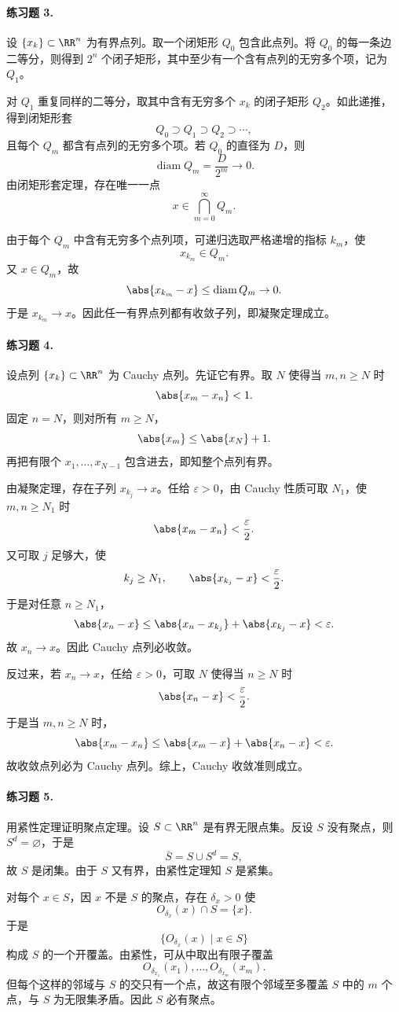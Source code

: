 \paragraph{练习题 3.}
\begin{xsolution}
设 $\{x_k\}\subset\RR^n$ 为有界点列。取一个闭矩形 $Q_0$ 包含此点列。将 $Q_0$ 的每一条边二等分，则得到 $2^n$ 个闭子矩形，其中至少有一个含有点列的无穷多个项，记为 $Q_1$。

对 $Q_1$ 重复同样的二等分，取其中含有无穷多个 $x_k$ 的闭子矩形 $Q_2$。如此递推，得到闭矩形套
\[
  Q_0\supset Q_1\supset Q_2\supset\cdots,
\]
且每个 $Q_m$ 都含有点列的无穷多个项。若 $Q_0$ 的直径为 $D$，则
\[
  \operatorname{diam}Q_m=\frac{D}{2^m}\to0.
\]
由闭矩形套定理，存在唯一一点
\[
  x\in\bigcap_{m=0}^\infty Q_m.
\]

由于每个 $Q_m$ 中含有无穷多个点列项，可递归选取严格递增的指标 $k_m$，使
\[
  x_{k_m}\in Q_m.
\]
又 $x\in Q_m$，故
\[
  \abs{x_{k_m}-x}\leq\operatorname{diam}Q_m\to0.
\]
于是 $x_{k_m}\to x$。因此任一有界点列都有收敛子列，即凝聚定理成立。
\end{xsolution}

\paragraph{练习题 4.}
\begin{xsolution}
设点列 $\{x_k\}\subset\RR^n$ 为 Cauchy 点列。先证它有界。取 $N$ 使得当 $m,n\geq N$ 时
\[
  \abs{x_m-x_n}<1.
\]
固定 $n=N$，则对所有 $m\geq N$，
\[
  \abs{x_m}\leq\abs{x_N}+1.
\]
再把有限个 $x_1,\ldots,x_{N-1}$ 包含进去，即知整个点列有界。

由凝聚定理，存在子列 $x_{k_j}\to x$。任给 $\varepsilon>0$，由 Cauchy 性质可取 $N_1$，使 $m,n\geq N_1$ 时
\[
  \abs{x_m-x_n}<\frac\varepsilon2.
\]
又可取 $j$ 足够大，使
\[
  k_j\geq N_1,
  \qquad
  \abs{x_{k_j}-x}<\frac\varepsilon2.
\]
于是对任意 $n\geq N_1$，
\[
  \abs{x_n-x}
  \leq\abs{x_n-x_{k_j}}+\abs{x_{k_j}-x}
  <\varepsilon.
\]
故 $x_n\to x$。因此 Cauchy 点列必收敛。

反过来，若 $x_n\to x$，任给 $\varepsilon>0$，可取 $N$ 使得当 $n\geq N$ 时
\[
  \abs{x_n-x}<\frac\varepsilon2.
\]
于是当 $m,n\geq N$ 时，
\[
  \abs{x_m-x_n}
  \leq\abs{x_m-x}+\abs{x_n-x}
  <\varepsilon.
\]
故收敛点列必为 Cauchy 点列。综上，Cauchy 收敛准则成立。
\end{xsolution}

\paragraph{练习题 5.}
\begin{xsolution}
用紧性定理证明聚点定理。设 $S\subset\RR^n$ 是有界无限点集。反设 $S$ 没有聚点，则 $S^d=\varnothing$，于是
\[
  \overline S=S\cup S^d=S,
\]
故 $S$ 是闭集。由于 $S$ 又有界，由紧性定理知 $S$ 是紧集。

对每个 $x\in S$，因 $x$ 不是 $S$ 的聚点，存在 $\delta_x>0$ 使
\[
  O_{\delta_x}(x)\cap S=\{x\}.
\]
于是
\[
  \{O_{\delta_x}(x)\mid x\in S\}
\]
构成 $S$ 的一个开覆盖。由紧性，可从中取出有限子覆盖
\[
  O_{\delta_{x_1}}(x_1),\ldots,O_{\delta_{x_m}}(x_m).
\]
但每个这样的邻域与 $S$ 的交只有一个点，故这有限个邻域至多覆盖 $S$ 中的 $m$ 个点，与 $S$ 为无限集矛盾。因此 $S$ 必有聚点。
\end{xsolution}

